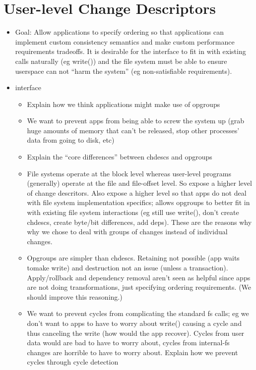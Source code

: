 \documentclass[10pt,twocolumn,letterpaper]{article}
\begin{document}
\section{User-level Change Descriptors}
\begin{itemize}
\item Goal: Allow applications to specify ordering so that
  applications can implement custom consistency semantics and make
  custom performance requirements tradeoffs. It is desirable for the
  interface to fit in with existing calls naturally (eg write()) and
  the file system must be able to ensure userspace can not ``harm the
  system'' (eg non-satisfiable requirements).
\item interface
  \begin{itemize}
  \item Explain how we think applications might make use of opgroups
  \item We want to prevent apps from being able to screw the system up
    (grab huge amounts of memory that can't be released, stop other
    processes' data from going to disk, etc)
  \item Explain the ``core differences'' between chdescs and
    opgroups
  \item File systems operate at the block level whereas user-level
    programs (generally) operate at the file and file-offset level.
    So expose a higher level of change descritors. Also expose a
    higher level so that apps do not deal with file system
    implementation specifics; allows opgroups to better fit in with
    existing file system interactions (eg still use write(), don't
    create chdescs, create byte/bit differences, add deps). These are
    the reasons why why we chose to deal with groups of changes
    instead of individual changes.
  \item Opgroups are simpler than chdescs. Retaining not possible (app
    waits tomake write) and destruction not an issue (unless a
    transaction). Apply/rollback and dependency removal aren't seen as
    helpful since apps are not doing transformations, just specifying
    ordering requirements. (We should improve this reasoning.)
  \item We want to prevent cycles from complicating the standard fs
    calls; eg we don't want to apps to have to worry about write()
    causing a cycle and thus canceling the write (how would the app
    recover). Cycles from user data would are bad to have to worry
    about, cycles from internal-fs changes are horrible to have to
    worry about. Explain how we prevent cycles through cycle detection

\end{itemize}
\end{itemize}
\end{document}
